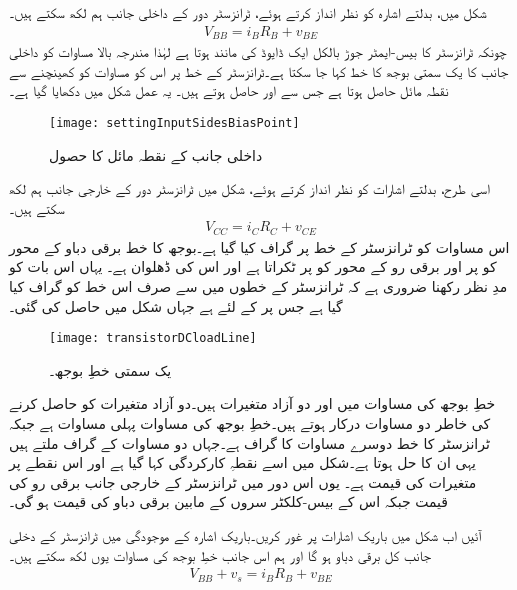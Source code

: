 شکل   میں، بدلتے اشارہ   کو نظر انداز کرتے ہوئے، ٹرانزسٹر دور کے داخلی جانب ہم لکھ سکتے ہیں۔
\begin{align}
V_{BB}=i_B R_B + v_{BE}
\end{align}
چونکہ ٹرانزسٹر کا بیس-ایمٹر  جوڑ بالکل ایک ڈایوڈ کی مانند ہوتا ہے لہٰذا مندرجہ بالا مساوات کو داخلی جانب کا یک سمتی بوجھ کا خط  کہا جا سکتا ہے۔ٹرانزسٹر کے  خط پر اس کو مساوات کو کھینچنے سے نقطہ مائل حاصل ہوتا ہے جس سے  اور  حاصل ہوتے ہیں۔ یہ عمل شکل   میں دکھایا گیا ہے۔
\begin{figure}
\centering
\texttt{[image: settingInputSidesBiasPoint]}
\caption{داخلی جانب کے نقطہ مائل کا حصول}
\label{شکل_داخلی_جانب_نکتہ_مائل_کا_حصول}
\end{figure}
اسی طرح، بدلتے اشارات کو نظر انداز کرتے ہوئے، شکل   میں ٹرانزسٹر دور کے خارجی جانب ہم لکھ سکتے ہیں۔
\begin{align} \label{مساوات_ٹرانزسٹر_بار}
V_{CC}=i_C R_C + v_{CE}
\end{align}
اس مساوات کو ٹرانزسٹر کے   خط پر گراف کیا گیا ہے۔بوجھ کا خط برقی دباو کے محور کو  پر اور برقی رو کے محور کو
پر ٹکراتا ہے اور اس کی ڈھلوان  ہے۔ یہاں اس بات کو مدِ نظر رکھنا ضروری ہے کہ ٹرانزسٹر کے   خطوں میں سے صرف اس خط کو گراف کیا گیا ہے جس پر  کے لئے ہے جہاں  شکل   میں حاصل کی گئی۔
\begin{figure}
\centering
\texttt{[image: transistorDCloadLine]}
\caption{یک سمتی خطِ بوجھ۔}
\label{شکل_ٹرانزسٹر_کے_یک_سمتی_بار_کا_خط}
\end{figure}
خطِ بوجھ  کی مساوات میں  اور  دو آزاد متغیرات ہیں۔دو آزاد متغیرات کو حاصل کرنے کی خاطر دو مساوات درکار ہوتے ہیں۔خطِ بوجھ کی مساوات پہلی مساوات ہے جبکہ ٹرانزسٹر کا  خط دوسرے مساوات کا گراف ہے۔جہاں دو مساوات کے گراف ملتے ہیں یہی ان کا حل ہوتا ہے۔شکل  میں اسے نقطہِ کارکردگی    کہا گیا ہے اور اس نقطے پر متغیرات کی قیمت    ہے۔ یوں اس دور میں ٹرانزسٹر کے خارجی جانب برقی رو کی قیمت جبکہ اس کے بیس-کلکٹر سروں کے مابین برقی دباو کی قیمت ہو گی۔


آئیں اب شکل   میں باریک اشارات پر غور کریں۔باریک اشارہ  کے موجودگی میں ٹرانزسٹر کے دخلی جانب کل برقی دباو  ہو گا اور ہم اس جانب خطِ بوجھ کی مساوات یوں لکھ سکتے ہیں۔
\begin{align}
V_{BB}+v_s = i_B R_B +v_{BE}
\end{align}

